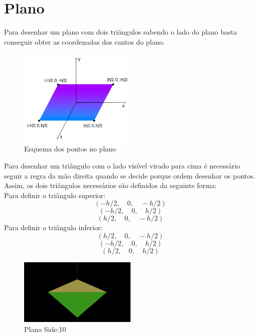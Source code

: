 \documentclass[a4paper]{report}
\begin{document}
\section{Plano}
Para desenhar um plano com dois triângulos sabendo o lado do plano basta
conseguir obter as coordenadas dos cantos do plano.\\
\begin{figure}[H]
    \centering 
    \includegraphics[width=0.5\textwidth]{images/esquema_plano.png}  
    \caption{Esquema dos pontos no plano}
    \label{fig:scheme_plane}
\end{figure}
Para desenhar um triângulo com o lado visível virado para cima é necessário
seguir a regra da mão direita quando se decide porque ordem desenhar os pontos.
Assim, os dois triângulos necessários são definidos da seguinte forma:\\
Para definir o triângulo superior:
\[(-h/2,\quad 0, \quad -h/2)\]
\[(-h/2,\quad  0, \quad h/2)\]
\[(h/2,\quad  0, \quad -h/2)\]
Para definir o triângulo inferior:
\[(h/2, \quad 0, \quad -h/2)\]
\[(-h/2, \quad  0, \quad  h/2)\]
\[(h/2, \quad  0, \quad h/2)\]

\begin{figure}[H]
    \centering 
    \includegraphics[width=0.5\textwidth]{images/plane.png}  
    \caption{Plano Side:10}
    \label{fig:plane}
\end{figure}
\end{document}
